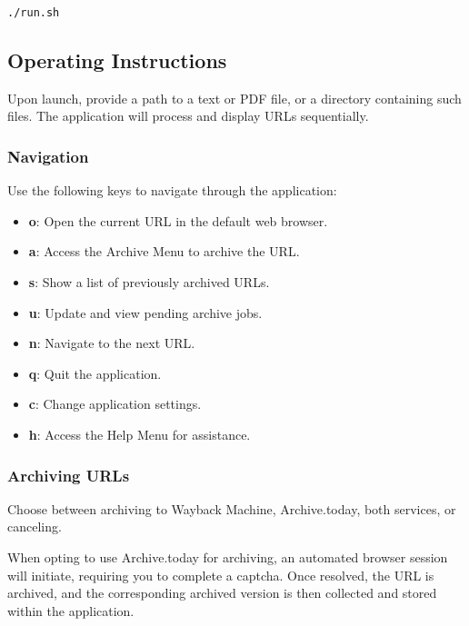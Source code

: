 \begin{lstlisting}[numbers=none, caption={Script to Run the URL-Archiver Application on Linux and macOS (User Manual)}, label={lst:user_run_unix}]
./run.sh
\end{lstlisting}




\subsection{Operating Instructions}

Upon launch, provide a path to a text or PDF file, or a directory containing such files. The application will process and display URLs sequentially.

\subsubsection{Navigation}

Use the following keys to navigate through the application:

\begin{itemize}
	\item \textbf{o}: Open the current URL in the default web browser.
	\item \textbf{a}: Access the Archive Menu to archive the URL.
	\item \textbf{s}: Show a list of previously archived URLs.
	\item \textbf{u}: Update and view pending archive jobs.
	\item \textbf{n}: Navigate to the next URL.
	\item \textbf{q}: Quit the application.
	\item \textbf{c}: Change application settings.
	\item \textbf{h}: Access the Help Menu for assistance.
\end{itemize}

\subsubsection{Archiving URLs}

Choose between archiving to Wayback Machine, Archive.today, both services, or canceling.

When opting to use Archive.today for archiving, an automated browser session will initiate, requiring you to complete a captcha. Once resolved, the URL is archived, and the corresponding archived version is then collected and stored within the application.

